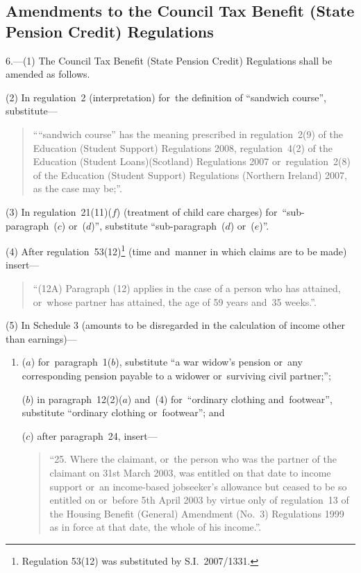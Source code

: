 \documentclass[12pt,a4paper]{article}
\begin{document}
\subsection[6. Amendments to the Council Tax Benefit (State Pension Credit) Regulations]{Amendments to the Council Tax Benefit (State Pension Credit) Regulations}

6.---(1)  The Council Tax Benefit (State Pension Credit) Regulations shall be amended as follows.

(2) In regulation~2 (interpretation) for~the definition of “sandwich course”, substitute—
\begin{quotation}
““sandwich course” has the meaning prescribed in regulation~2(9) of the Education (Student Support) Regulations 2008, regulation~4(2) of the Education (Student Loans)(Scotland) Regulations 2007 or~regulation~2(8) of the Education (Student Support) Regulations (Northern Ireland) 2007, as the case may be;”.
\end{quotation}

(3) In regulation~21(11)($f$)  (treatment of child care charges) for~“sub-paragraph~($c$)  or~($d$)”, substitute “sub-paragraph~($d$)  or~($e$)”.

(4) After regulation~53(12)\footnote{Regulation 53(12) was substituted by S.I.~2007/1331.} (time and~manner in which claims are to be made) insert—
\begin{quotation}
“(12A) Paragraph (12) applies in the case of a person who has attained, or~whose partner has attained, the age of 59 years and~35 weeks.”.
\end{quotation}

(5) In Schedule 3 (amounts to be disregarded in the calculation of income other than earnings)—
\begin{enumerate}\item[]
($a$) for~paragraph~1($b$), substitute “a war widow’s pension or~any corresponding pension payable to a widower or~surviving civil partner;”;

($b$) in paragraph~12(2)($a$)  and~(4) for~“ordinary clothing and~footwear”, substitute “ordinary clothing or~footwear”; and

($c$) after paragraph~24, insert—
\begin{quotation}
“25.  Where the claimant, or~the person who was the partner of the claimant on 31st March 2003, was entitled on that date to income support or~an income-based jobseeker’s allowance but ceased to be so entitled on or~before 5th April 2003 by virtue only of regulation~13 of the Housing Benefit (General) Amendment (No.~3) Regulations 1999 as in force at that date, the whole of his income.”.
\end{quotation}
\end{enumerate}
\end{document}
